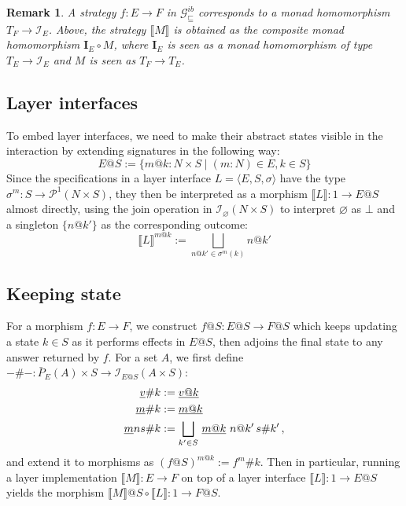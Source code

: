 \documentclass[11pt,oneside]{book}
\newtheorem{remark}[theorem]{Remark}
\theoremstyle{definition}
\newcommand{\gcat}{\mathcal{G}_{\sqsubseteq}}
\newcommand{\ul}[1]{%
  \underline{\smash{#1}}
}
\begin{document}
\begin{remark}
A strategy $f : E \rightarrow F$ in $\gcat^{ib}$
corresponds to a monad homomorphism $T_F \rightarrow \mathcal{I}_E$.
Above,
the strategy $\llbracket M \rrbracket$
is obtained as the composite monad homomorphism
$\mathbf{I}_E \circ M$,
where $\mathbf{I}_E$ is seen as
a monad homomorphism of type $T_E \rightarrow \mathcal{I}_E$
and $M$ is seen as $T_F \rightarrow T_E$.
\end{remark}


\subsection{Layer interfaces} %

To embed layer interfaces,
we need to make their abstract states
visible in the interaction
by extending signatures in the following way:
\[
  E@S :=
    \{ m@k : N \times S \mid
       (m \mathbin: N) \in E, k \in S \}
\]
Since the specifications in a layer interface
$L = \langle E, S, \sigma \rangle$
have the type $\sigma^m : S \rightarrow \mathcal{P}^1(N \times S)$,
they then be interpreted as
a morphism $\llbracket L \rrbracket : 1 \rightarrow E@S$
almost directly,
using the join operation in $\mathcal{I}_\varnothing(N \times S)$
to interpret $\varnothing$ as $\bot$
and a singleton $\{ n@k' \}$ as the corresponding outcome:
\[
  \llbracket L \rrbracket^{m@k} :=
    \bigsqcup_{n@k' \in \sigma^m(k)} n@k'
\]


\subsection{Keeping state} %

For a morphism $f : E \rightarrow F$,
we construct $f@S : E@S \rightarrow F@S$
which keeps updating a state $k \in S$
as it performs effects in $E@S$,
then adjoins the final state to any answer
returned by $f$.
For a set $A$, we first define
$-\#- : \bar{P}_E(A) \times S \rightarrow \mathcal{I}_{E@S}(A \times S)$:
\begin{align*}
  \ul{v}\#k &:= \ul{v@k} \\
  \ul{m}\#k &:= \ul{m@k} \\
  \ul{m}ns\#k &:=
    \bigsqcup_{k' \in S} \, \ul{m@k} \,\, n@k' \, s\#k' \,,
\end{align*}
and extend it to morphisms as $(f@S)^{m@k} := f^m\#k$.
Then in particular,
running a layer implementation
$\llbracket M \rrbracket : E \rightarrow F$
on top of a layer interface
$\llbracket L \rrbracket : 1 \rightarrow E@S$
yields the morphism
$\llbracket M \rrbracket @ S \circ \llbracket L \rrbracket :
 1 \rightarrow F@S$.
\end{document}
